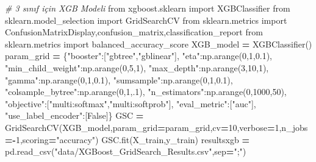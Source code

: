 \documentclass[12pt,twoside]{deuthesis}
\newenvironment{Shaded}{\begin{snugshade}}{\end{snugshade}}
\newcommand{\CommentTok}[1]{\textcolor[rgb]{0.56,0.35,0.01}{\textit{#1}}}
\newcommand{\DecValTok}[1]{\textcolor[rgb]{0.00,0.00,0.81}{#1}}
\newcommand{\FloatTok}[1]{\textcolor[rgb]{0.00,0.00,0.81}{#1}}
\newcommand{\ImportTok}[1]{#1}
\newcommand{\NormalTok}[1]{#1}
\newcommand{\OperatorTok}[1]{\textcolor[rgb]{0.81,0.36,0.00}{\textbf{#1}}}
\newcommand{\StringTok}[1]{\textcolor[rgb]{0.31,0.60,0.02}{#1}}
\newcommand{\VariableTok}[1]{\textcolor[rgb]{0.00,0.00,0.00}{#1}}
\begin{document}
\scriptsize
\begin{Shaded}
\begin{Highlighting}[]
\CommentTok{\# 3 sınıf için XGB Modeli}
\ImportTok{from}\NormalTok{ xgboost.sklearn }\ImportTok{import}\NormalTok{ XGBClassifier}
\ImportTok{from}\NormalTok{ sklearn.model\_selection }\ImportTok{import}\NormalTok{ GridSearchCV}
\ImportTok{from}\NormalTok{ sklearn.metrics }\ImportTok{import}\NormalTok{ ConfusionMatrixDisplay,confusion\_matrix,classification\_report}
\ImportTok{from}\NormalTok{ sklearn.metrics }\ImportTok{import}\NormalTok{ balanced\_accuracy\_score}
\NormalTok{XGB\_model }\OperatorTok{=}\NormalTok{ XGBClassifier()}
\NormalTok{param\_grid }\OperatorTok{=}\NormalTok{ \{}\StringTok{"booster"}\NormalTok{:[}\StringTok{"gbtree"}\NormalTok{,}\StringTok{"gblinear"}\NormalTok{],}
              \StringTok{"eta"}\NormalTok{:np.arange(}\DecValTok{0}\NormalTok{,}\DecValTok{1}\NormalTok{,}\FloatTok{0.1}\NormalTok{),}
              \StringTok{"min\_child\_weight"}\NormalTok{:np.arange(}\DecValTok{0}\NormalTok{,}\DecValTok{5}\NormalTok{,}\DecValTok{1}\NormalTok{),}
              \StringTok{"max\_depth"}\NormalTok{:np.arange(}\DecValTok{3}\NormalTok{,}\DecValTok{10}\NormalTok{,}\DecValTok{1}\NormalTok{),}
              \StringTok{"gamma"}\NormalTok{:np.arange(}\DecValTok{0}\NormalTok{,}\DecValTok{1}\NormalTok{,}\FloatTok{0.1}\NormalTok{),}
              \StringTok{"sumsample"}\NormalTok{:np.arange(}\DecValTok{0}\NormalTok{,}\DecValTok{1}\NormalTok{,}\FloatTok{0.1}\NormalTok{),}
              \StringTok{"colsample\_bytree"}\NormalTok{:np.arange(}\DecValTok{0}\NormalTok{,}\DecValTok{1}\NormalTok{,}\FloatTok{.1}\NormalTok{),}
              \StringTok{"n\_estimators"}\NormalTok{:np.arange(}\DecValTok{0}\NormalTok{,}\DecValTok{1000}\NormalTok{,}\DecValTok{50}\NormalTok{),}
              \StringTok{"objective"}\NormalTok{:[}\StringTok{"multi:softmax"}\NormalTok{,}\StringTok{"multi:softprob"}\NormalTok{],}
              \StringTok{"eval\_metric"}\NormalTok{:[}\StringTok{"auc"}\NormalTok{],}
              \StringTok{"use\_label\_encoder"}\NormalTok{:[}\VariableTok{False}\NormalTok{]\}}
\NormalTok{GSC }\OperatorTok{=}\NormalTok{ GridSearchCV(XGB\_model,param\_grid}\OperatorTok{=}\NormalTok{param\_grid,cv}\OperatorTok{=}\DecValTok{10}\NormalTok{,verbose}\OperatorTok{=}\DecValTok{1}\NormalTok{,n\_jobs}\OperatorTok{={-}}\DecValTok{1}\NormalTok{,scoring}\OperatorTok{=}\StringTok{"accuracy"}\NormalTok{)}
\NormalTok{GSC.fit(X\_train,y\_train)}
\NormalTok{resultsxgb }\OperatorTok{=}\NormalTok{ pd.read\_csv(}\StringTok{"data/XGBoost\_GridSearch\_Results.csv"}\NormalTok{,sep}\OperatorTok{=}\StringTok{";"}\NormalTok{)}

\end{Highlighting}
\end{Shaded}
\end{document}
